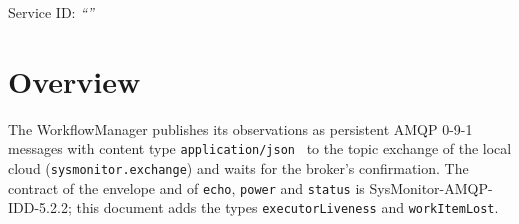 \documentclass[a4paper]{arrowhead}
\begin{document}
\ArrowheadSetup

\begin{center}
  \vspace*{1cm}
  \huge{\arrowtitle}

  \vspace*{0.2cm}
  \LARGE{\arrowtype}
  \vspace*{1cm}

  \Large{Service ID: \textit{``\arrowid''}}
  \vspace*{\fill}

  

  \vspace*{1cm}
  \vspace*{\fill}

  \begin{abstract}
    This document describes the AMQP/TLS/JSON interface of the WorkflowManager's own observation types of the \texttt{sysMonitor} service, service version 1.0.0, documentation edition 5.4.0. It realises the \texttt{sysMonitor} SD of the WorkflowManager.
  \end{abstract}

  \vspace*{1cm}
\end{center}

\newpage

\tableofcontents
\newpage

\section{Overview}
\label{sec:overview}
The WorkflowManager publishes its observations as persistent AMQP 0-9-1 messages with content type
\texttt{application/\allowbreak{}json}~\cite{rfc8259} to the topic exchange of the local cloud (\texttt{sysmonitor.\allowbreak{}exchange}) and waits
for the broker's confirmation. The contract of the envelope and of \texttt{echo}, \texttt{power} and \texttt{status} is
SysMonitor-AMQP-IDD-5.2.2; this document adds the types \texttt{executor\allowbreak{}Liveness} and \texttt{workItemLost}.
\end{document}
